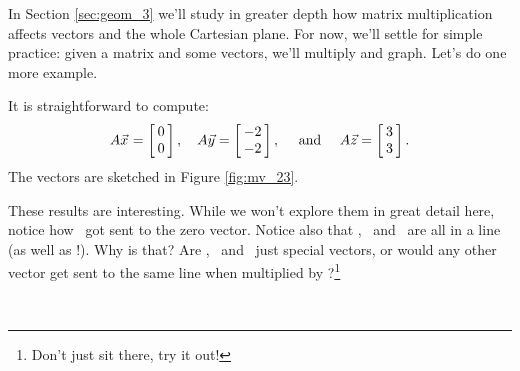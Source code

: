 In Section \ref{sec:geom_3} we'll study in greater depth how matrix multiplication affects vectors and the whole Cartesian plane. For now, we'll settle for simple practice: given a matrix and some vectors, we'll multiply and graph. Let's do one more example.\\


{\begin{myfigure}%
\begin{center}
\end{center}
\label{fig:mv_23}
\end{myfigure}%

It is straightforward to compute: $$\tta\vx = \bmx{c} 0\\0\emx,\quad \tta\vy = \bmx{c} -2\\-2\emx, \quad \text{ and } \quad \tta\vz = \bmx{c} 3\\3\emx.$$ The vectors are sketched in Figure \ref{fig:mv_23}.

These results are interesting. While we won't explore them in great detail here, notice how \vx\ got sent to the zero vector. Notice also that \tta\vx, \tta\vy\ and \tta\vz\ are all in a line (as well as \vx!). Why is that? Are \vx, \vy\ and \vz\ just special vectors, or would any other vector get sent to the same line when multiplied by \tta?\footnote{Don't just sit there, try it out!}
}\\


